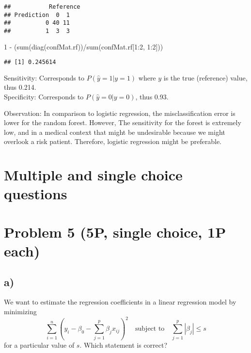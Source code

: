 \documentclass[
]{article}
\newenvironment{Shaded}{\begin{snugshade}}{\end{snugshade}}
\newcommand{\DecValTok}[1]{\textcolor[rgb]{0.00,0.00,0.81}{#1}}
\newcommand{\FunctionTok}[1]{\textcolor[rgb]{0.00,0.00,0.00}{#1}}
\newcommand{\NormalTok}[1]{#1}
\newcommand{\SpecialCharTok}[1]{\textcolor[rgb]{0.00,0.00,0.00}{#1}}
\begin{document}
\begin{verbatim}
##           Reference
## Prediction  0  1
##          0 40 11
##          1  3  3
\end{verbatim}

\begin{Shaded}
\begin{Highlighting}[]
\DecValTok{1} \SpecialCharTok{{-}}\NormalTok{ (}\FunctionTok{sum}\NormalTok{(}\FunctionTok{diag}\NormalTok{(confMat.rf))}\SpecialCharTok{/}\FunctionTok{sum}\NormalTok{(confMat.rf[}\DecValTok{1}\SpecialCharTok{:}\DecValTok{2}\NormalTok{, }\DecValTok{1}\SpecialCharTok{:}\DecValTok{2}\NormalTok{]))}
\end{Highlighting}
\end{Shaded}

\begin{verbatim}
## [1] 0.245614
\end{verbatim}

Sensitivity: Corresponds to \(P(\hat{y}=1 | y=1)\) where \(y\) is the
true (reference) value, thus 0.214.\\
Specificity: Corresponds to \(P(\hat{y}=0 | y=0)\), thus 0.93.

Observation: In comparison to logistic regression, the misclassification
error is lower for the random forest. However, The sensitivity for the
forest is extremely low, and in a medical context that might be
undesirable because we might overlook a risk patient. Therefore,
logistic regression might be preferable.

\hypertarget{multiple-and-single-choice-questions}{%
\section{Multiple and single choice
questions}\label{multiple-and-single-choice-questions}}

\hypertarget{problem-5-5p-single-choice-1p-each}{%
\section{Problem 5 (5P, single choice, 1P
each)}\label{problem-5-5p-single-choice-1p-each}}

\hypertarget{a}{%
\subsection{a)}\label{a}}

We want to estimate the regression coefficients in a linear regression
model by minimizing
\[\sum_{i=1}^n (y_i - \beta_0 - \sum_{j=1}^p \beta_j x_{ij})^2 \quad \text{subject to} \quad \sum_{j=1}^p |\beta_j| \leq s 
\] for a particular value of \(s\). Which statement is correct?
\end{document}
